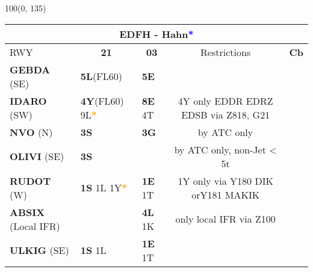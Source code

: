 \documentclass[10pt,landscape,a4paper]{article}
\begin{document}
\begin{textblock}{100}(0, 135)
\begin{table}[]
\begin{tabular}{|llllll}
\multicolumn{6}{c}{\textbf{EDFH - Hahn\textcolor{blue}{*}}} \\ \hline
\multicolumn{1}{|l|}{RWY} 									& \multicolumn{1}{c|}{\textbf{21}} 			& \multicolumn{1}{c|}{\textbf{03}}  				& \multicolumn{2}{c|}{Restrictions} 				& \multicolumn{1}{c|}{\textbf{Cb}} 							\\ \hline
\multicolumn{1}{|l|}{\textbf{GEBDA} (SE)}							& \multicolumn{1}{l|}{\textbf{5L}(FL60)}			& \multicolumn{1}{l|}{\textbf{5E}} 				& \multicolumn{2}{c|}{}						& \multicolumn{1}{c|}{\multirow{7}{*}{\rotatebox{90}{5000ft}}}			 \\ \cline{1-5}
\multicolumn{1}{|l|}{\textbf{IDARO} (SW)}							& \multicolumn{1}{l|}{\textbf{4Y}(FL60) 9L\textbf{\textcolor{orange}{*}}}	& \multicolumn{1}{l|}{\textbf{ 8E} 4T}	& \multicolumn{2}{c|}{4Y only EDDR EDRZ EDSB  via Z818, G21}  & \multicolumn{1}{c|}{}								\\ \cline{1-5}

\multicolumn{1}{|l|}{\textbf{NVO} (N)} 								& \multicolumn{1}{l|}{\textbf{3S}} 			& \multicolumn{1}{l|}{\textbf{3G}}				& \multicolumn{2}{c|}{by ATC only} 				& \multicolumn{1}{c|}{} 									\\ \cline{1-5}
\multicolumn{1}{|l|}{\textbf{OLIVI} (SE)}							& \multicolumn{1}{l|}{\textbf{3S}}			& \multicolumn{1}{l|}{}						& \multicolumn{2}{c|}{by ATC only, non-Jet < 5t} 		& \multicolumn{1}{c|}{}									\\ \cline{1-5} 

\multicolumn{1}{|l|}{\textbf{RUDOT} (W)} 							& \multicolumn{1}{l|}{\textbf{1S} 1L 1Y\textbf{\textcolor{orange}{*}}}& \multicolumn{1}{l|}{\textbf{1E} 1T}	& \multicolumn{2}{c|}{1Y only via Y180 DIK orY181 MAKIK}	& \multicolumn{1}{c|}{}			 						\\\cline{1-5} 
\multicolumn{1}{|l|}{\textbf{ABSIX} (Local IFR)} 						& \multicolumn{1}{l|}{}					& \multicolumn{1}{l|}{\textbf{4L} 1K}				& \multicolumn{2}{c|}{only local IFR  via Z100}		& \multicolumn{1}{c|}{}									\\\cline{1-5} 
\multicolumn{1}{|l|}{\textbf{ULKIG} (SE)} 							& \multicolumn{1}{l|}{\textbf{1S} 1L} 			& \multicolumn{1}{l|}{\textbf{1E} 1T}				& \multicolumn{2}{c|}{}  						& \multicolumn{1}{c|}{}									\\ \hline
\end{tabular}
\end{table}
\end{textblock}
\end{document}
